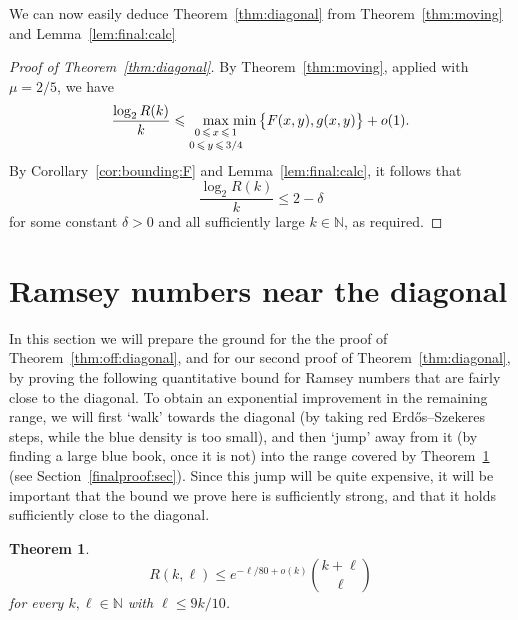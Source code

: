 \documentclass[12pt,reqno]{amsart}
\newtheorem{theorem}{Theorem}[section]
\theoremstyle{definition}
\theoremstyle{remark}
\newcommand\N{\mathbb{N}}
\renewcommand{\le}{\leqslant}
\def\N{\mathbb{N}}
\begin{document}
We can now easily deduce Theorem~\ref{thm:diagonal} from Theorem~\ref{thm:moving} and Lemma~\ref{lem:final:calc}
 
\begin{proof}[Proof of Theorem~\ref{thm:diagonal}]
By Theorem~\ref{thm:moving}, applied with $\mu = 2/5$, we have 
$$\frac{\log_2 R(k)}{k} \le \max_{\substack{\\[-0.05ex] 0 \,\le\, x \,\le\, 1 \\[+0.3ex] 0 \,\le\, y \,\le\, 3/4}} \hspace{-0.3cm} \min \big\{ F(x,y),g(x,y) \big\} + o(1).$$
By Corollary~\ref{cor:bounding:F} and Lemma~\ref{lem:final:calc}, it follows that
$$\frac{\log_2 R(k)}{k} \le 2 - \delta$$
for some constant $\delta > 0$ and all sufficiently large $k \in \N$, as required.
\end{proof} 
 
 
\section{Ramsey numbers near the diagonal}\label{neardiagonal:sec}

In this section we will prepare the ground for the the proof of Theorem~\ref{thm:off:diagonal}, and for our second proof of Theorem~\ref{thm:diagonal}, by proving the following quantitative bound for Ramsey numbers that are fairly close to the diagonal. To obtain an exponential improvement in the remaining range, we will first `walk' towards the diagonal (by taking red Erd\H{o}s--Szekeres steps, while the blue density is too small), and then `jump' away from it (by finding a large blue book, once it is not) into the range covered by Theorem~\ref{thm:off:diagonal:near} (see Section~\ref{finalproof:sec}). Since this jump will be quite expensive, it will be important that the bound we prove here is sufficiently strong, and that it holds sufficiently close to the diagonal. 


\begin{theorem}\label{thm:off:diagonal:near}
$$R(k,\ell) \le e^{-\ell/80 + o(k)} {k + \ell \choose \ell}$$
for every $k,\ell \in \N$ with $\ell \le 9k/10$.
\end{theorem}
\end{document}

